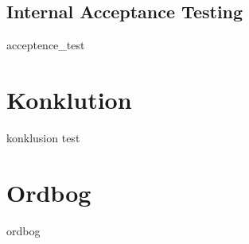 \documentclass{article}
\begin{document}
{\subsection{Internal Acceptance Testing}
{acceptence_test}

\section{Konklution}
{konklusion}
test

\newpage
\section*{Ordbog}

{ordbog}




\newpage
\cleardoublepage
\printbibliography[heading=bibintoc]
}
\end{document}
